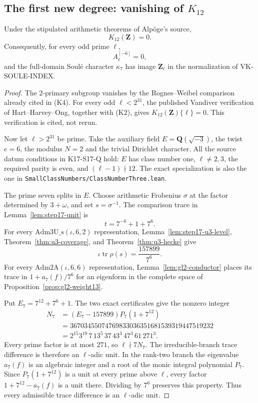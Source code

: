 \subsection{The first new degree: vanishing of \texorpdfstring{$K_{12}$}{K12}}
\label{sec:k12-hecke-vanishing}

\begin{theorem}[K17-K12-VANISH]\label{thm:k12-vanish}
Under the stipulated arithmetic theorems of Alp\"oge's source,
\[
                         K_{12}(\mathbf Z)=0.
\]
Consequently, for every odd prime $\ell$,
\[
 A_\ell^{[-6]}=0,
\]
and the full-domain Soul\'e character $\kappa_7$ has image
$\mathbf Z_\ell$ in the normalization of VK-SOULE-INDEX.
\end{theorem}

\begin{proof}
The 2-primary subgroup vanishes by the Rognes--Weibel comparison already
cited in (K4). For every odd $\ell<2^{31}$, the published Vandiver
verification of Hart--Harvey--Ong, together with (K2), gives
$K_{12}(\mathbf Z)\{\ell\}=0$. This verification is cited, not rerun.

Now let $\ell>2^{31}$ be prime. Take the auxiliary field
$E=\mathbf Q(\sqrt{-3})$, the twist $e=6$, the modulus $N=2$ and the
trivial Dirichlet character. All the source datum conditions in K17-S17-Q
hold: $E$ has class number one, $\ell\ne2,3$, the required parity is even,
and $(\ell-1)\nmid12$. The exact specialization is also the one in
\texttt{SmallClassNumbers/ClassNumberThree.lean}.

The prime seven splits in $E$. Choose arithmetic Frobenius $\sigma$
at the factor determined by $3+\omega$, and set $s=\sigma^{-1}$.
The comparison trace in Lemma~\ref{lem:step17-unit} is
\[
                t=7^{-6}+1+7^6.
\]
For every $\mathrm{Adm3U\_s}(\iota,6,2)$ representation,
Lemma~\ref{lem:step17-u3-level}, Theorem~\ref{thm:u3-coverage}, and
Theorem~\ref{thm:u3-hecke} give
\[
 \iota\operatorname{tr}\rho(s)=\frac{157899}{7^6}.
\]
For every $\mathrm{Adm2A}(\iota,6,6)$ representation,
Lemma~\ref{lem:gl2-conductor} places its trace in
$1+a_7(f)/7^6$ for an eigenform in the complete space of
Proposition~\ref{prop:gl2-weight13}.

Put $E_7=7^{12}+7^6+1$. The two exact certificates give the nonzero
integer
\begin{align*}
 N_7
 &=(E_7-157899)P_7(1+7^{12})\\
 &=36703455074769833036351681539319447519232\\
 &=2^{15}3^{19}\,7\,13^5\,37\,43^3\,47^3\,61\,271^3.
\end{align*}
Every prime factor is at most $271$, so $\ell\nmid7N_7$.
The irreducible-branch trace difference is therefore an $\ell$-adic
unit. In the rank-two branch the eigenvalue $a_7(f)$ is an algebraic
integer and a root of the monic integral polynomial $P_7$.
Since $P_7(1+7^{12})$ is a unit at every prime above $\ell$, every factor
$1+7^{12}-a_7(f)$ is a unit there. Dividing by $7^6$ preserves this
property. Thus every admissible trace difference is an $\ell$-adic unit.


\end{proof}
